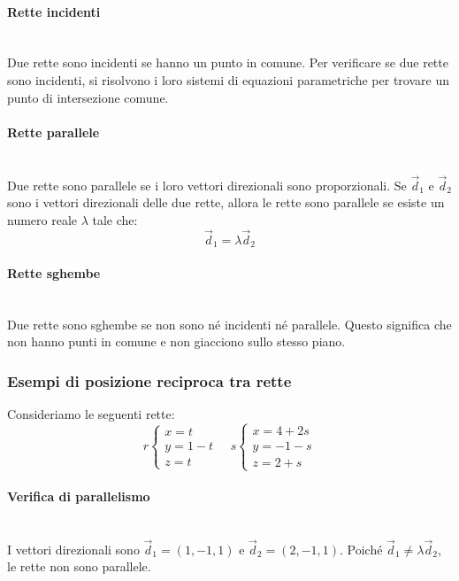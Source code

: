 \documentclass{article}
\begin{document}
\paragraph{Rette incidenti} \phantom{}\\
Due rette sono incidenti se hanno un punto in comune. Per verificare se due rette sono
incidenti, si risolvono i loro sistemi di equazioni parametriche per trovare un punto di
intersezione comune.

\paragraph{Rette parallele} \phantom{}\\
Due rette sono parallele se i loro vettori direzionali sono proporzionali.
Se \( \vec{d}_1 \) e \( \vec{d}_2 \) sono i vettori direzionali delle due rette,
allora le rette sono parallele se esiste un numero reale \(\lambda\) tale che:
\[
    \vec{d}_1 = \lambda \vec{d}_2
\]

\paragraph{Rette sghembe} \phantom{}\\
Due rette sono sghembe se non sono né incidenti né parallele. Questo significa che non hanno
punti in comune e non giacciono sullo stesso piano.

\newpage
\subsubsection{Esempi di posizione reciproca tra rette}
Consideriamo le seguenti rette:
\[
    r \begin{cases}
        x = t \\
        y = 1 - t \\
        z = t
    \end{cases}
\quad
    s \begin{cases}
        x = 4 + 2s \\
        y = -1 - s \\
        z = 2 + s
    \end{cases}
\]

\paragraph{Verifica di parallelismo} \phantom{}\\
I vettori direzionali sono \( \vec{d}_1 = (1, -1, 1) \) e \( \vec{d}_2 = (2, -1, 1) \).
Poiché \( \vec{d}_1 \neq \lambda \vec{d}_2 \), le rette non sono parallele.
\end{document}
